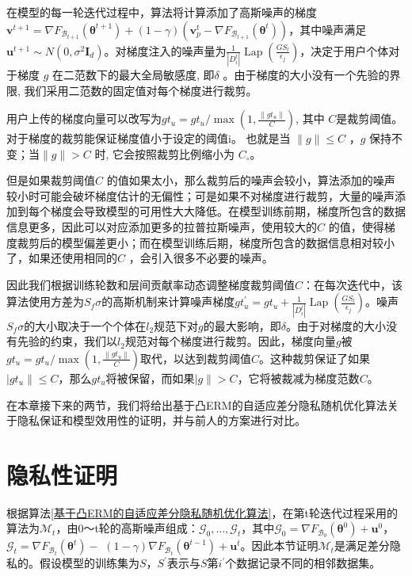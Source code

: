 在模型的每一轮迭代过程中，算法将计算添加了高斯噪声的梯度$\mathbf{v}^{t+1}=\nabla F_{\mathcal{B}_{t+1}}\left(\boldsymbol{\theta}^{t+1}\right)+(1-\gamma)\left(\mathbf{v}_{p}^{t}-\nabla F_{\mathcal{B}_{t+1}}\left(\boldsymbol{\theta}^{t}\right)\right)$，其中噪声满足$\mathbf{u}^{t+1} \sim N\left(0, \sigma^{2} \mathbf{I}_{d}\right)$。对梯度注入的噪声量为$\frac{1}{\left|D_{i}^{t}\right|} \operatorname{Lap}\left(\frac{G S_{l}}{\epsilon_{j}}\right)$，决定于用户个体对于梯度 $g$ 在二范数下的最大全局敏感度, 即$\delta$ 。由于梯度的大小没有一个先验的界限, 我们采用二范数的固定值对每个梯度进行裁剪。

用户上传的梯度向量可以改写为$g t_{u}=g t_{u} / \max \left(1, \frac{\left\|g t_{u}\right\|}{C}\right)$, 其中 $C$是裁剪阈值。对于梯度的裁剪能保证梯度值小于设定的阈值$\mathrm{i}$。 也就是当 $\|g\| \leq C$ ，$g$ 保持不变；当$\|g\|>C$ 时, 它会按照裁剪比例缩小为 $C_{\circ}$。

但是如果裁剪阈值$C$ 的值如果太小，那么裁剪后的噪声会较小，算法添加的噪声较小时可能会破坏梯度估计的无偏性；可是如果不对梯度进行裁剪，大量的噪声添加到每个梯度会导致模型的可用性大大降低。在模型训练前期，梯度所包含的数据信息更多，因此可以对应添加更多的拉普拉斯噪声，使用较大的$C$ 的值，使得梯度裁剪后的模型偏差更小；而在模型训练后期，梯度所包含的数据信息相对较小了，如果还使用相同的$C$ ，会引入很多不必要的噪声。

因此我们根据训练轮数和层间贡献率动态调整梯度裁剪阈值$C$：在每次迭代中，该算法使用方差为$S_{f} \sigma$的高斯机制来计算噪声梯度$g t_{u}^{\prime}=g t_{u}+\frac{1}{\left|D_{i}^{t}\right|} \operatorname{Lap}\left(\frac{G S_{l}}{\epsilon_{j}}\right)$。噪声$S_{f} \sigma$的大小取决于一个个体在$l_{2}$规范下对$g$的最大影响，即$\delta$。由于对梯度的大小没有先验的约束，我们以$l_{2}$规范对每个梯度进行裁剪。因此，梯度向量$g$被$g t_{u}=g t_{u} / \max \left(1, \frac{\left\|g t_{u}\right\|}{C}\right)$取代，以达到裁剪阈值$C$。这种裁剪保证了如果$|g t_{u}\| \leq C$，那么$g t_{u}$将被保留，而如果$|g\|>C$，它将被裁减为梯度范数$C$。

在本章接下来的两节，我们将给出基于凸ERM的自适应差分隐私随机优化算法关于隐私保证和模型效用性的证明，并与前人的方案进行对比。

\section{隐私性证明}
根据算法\ref{基于凸ERM的自适应差分隐私随机优化算法}，在第t轮迭代过程采用的算法为$\mathcal{M}_{t}$，由0～t轮的高斯噪声组成：$\mathcal{G}_{0}, \ldots, \mathcal{G}_{t}$，其中$\mathcal{G}_{0}=\nabla F_{\mathcal{B}_{0}}\left(\boldsymbol{\theta}^{0}\right)+\mathbf{u}^{0}$，$\mathcal{G}_{t}=\nabla F_{\mathcal{B}_{t}}\left(\boldsymbol{\theta}^{t}\right)-$ $(1-\gamma) \nabla F_{\mathcal{B}_{t}}\left(\boldsymbol{\theta}^{t-1}\right)+\mathbf{u}^{t}$。因此本节证明$\mathcal{M}_{t}$是满足差分隐私的。假设模型的训练集为$S$，$S^{\prime}$表示与$S$第$i^{\prime}$个数据记录不同的相邻数据集。

